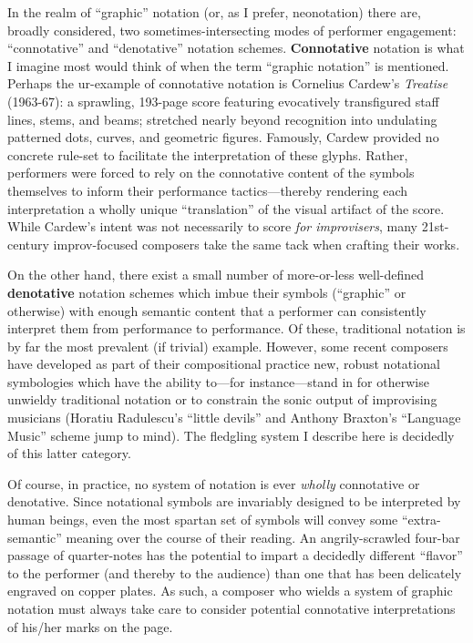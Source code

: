 \documentclass[twoside, 11pt]{book}
\begin{document}
    In the realm of ``graphic'' notation (or, as I prefer, neonotation) there are, broadly considered, two sometimes-intersecting modes of performer engagement: ``connotative'' and ``denotative'' notation schemes. \textbf{Connotative} notation is what I imagine most would think of when the term ``graphic notation'' is mentioned. Perhaps the ur-example of connotative notation is Cornelius Cardew's \textit{Treatise} (1963-67): a sprawling, 193-page score featuring evocatively transfigured staff lines, stems, and beams; stretched nearly beyond recognition into undulating patterned dots, curves, and geometric figures. Famously, Cardew provided no concrete rule-set to facilitate the interpretation of these glyphs. Rather, performers were forced to rely on the connotative content of the symbols themselves to inform their performance tactics---thereby rendering each interpretation a wholly unique ``translation'' of the visual artifact of the score. While Cardew's intent was not necessarily to score \textit{for improvisers}, many 21st-century improv-focused composers take the same tack when crafting their works.

    On the other hand, there exist a small number of more-or-less well-defined \textbf{denotative} notation schemes which imbue their symbols (``graphic'' or otherwise) with enough semantic content that a performer can consistently interpret them from performance to performance. Of these, traditional notation is by far the most prevalent (if trivial) example. However, some recent composers have developed as part of their compositional practice new, robust notational symbologies which have the ability to---for instance---stand in for otherwise unwieldy traditional notation or to constrain the sonic output of improvising musicians (Horatiu Radulescu's ``little devils'' and Anthony Braxton's ``Language Music'' scheme jump to mind). The fledgling system I describe here is decidedly of this latter category. 
    
    Of course, in practice, no system of notation is ever \textit{wholly} connotative or denotative. Since notational symbols are invariably designed to be interpreted by human beings, even the most spartan set of symbols will convey some ``extra-semantic'' meaning over the course of their reading. An angrily-scrawled four-bar passage of quarter-notes has the potential to impart a decidedly different ``flavor'' to the performer (and thereby to the audience) than one that has been delicately engraved on copper plates. As such, a composer who wields a system of graphic notation must always take care to consider potential connotative interpretations of his/her marks on the page.
\end{document}
